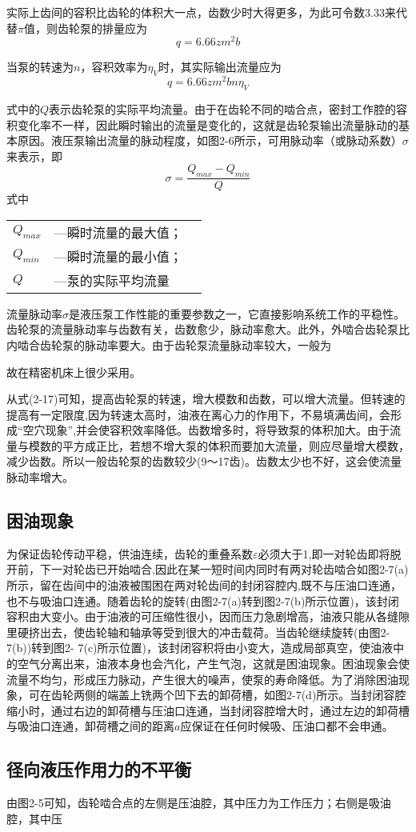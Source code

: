 实际上齿间的容积比齿轮的体积大一点，齿数少时大得更多，为此可令数3.33来代替$\pi$值，则齿轮泵的排量应为
\begin{equation}
  q=6.66 z m^2 b
\end{equation}

当泵的转速为$n$，容积效率为$\eta_{V}$时，其实际输出流量应为
\begin{equation}
  q=6.66 z m^2 b n \eta_{V}
\end{equation}

式中的$Q$表示齿轮泵的实际平均流量。由于在齿轮不同的啮合点，密封工作腔的容积变化率不一样，因此瞬时输出的流量是变化的，这就是齿轮泵输出流量脉动的基本原因。液压泵输出流量的脉动程度，如图2-6所示，可用脉动率（或脉动系数）$\sigma$来表示，即
\begin{equation}
  \sigma=\frac{{Q_{max}-Q_{min}}}{Q}
\end{equation} 
\noindent 式中\
\begin{tabular}[t]{lll}
  $Q_{max}$ &---瞬时流量的最大值；\\
  $Q_{min}$ &---瞬时流量的最小值；\\
  $Q$ &---泵的实际平均流量
  \end{tabular}
流量脉动率$\sigma$是液压泵工作性能的重要参数之一，它直接影响系统工作的平稳性。齿轮泵的流量脉动率与齿数有关，齿数愈少，脉动率愈大。此外，外啮合齿轮泵比内啮合齿轮泵的脉动率要大。由于齿轮泵流量脉动率较大，一般为

故在精密机床上很少采用。

从式(2-17)可知，提高齿轮泵的转速，增大模数和齿数，可以增大流量。但转速的提高有一定限度,因为转速太高时，油液在离心力的作用下，不易填满齿间，会形成“空穴现象”,并会使容积效率降低。齿数增多时，将导致泵的体积加大。由于流量与模数的平方成正比，若想不增大泵的体积而要加大流量，则应尽量增大模数，减少齿数。所以一般齿轮泵的齿数较少(9～17齿)。齿数太少也不好，这会使流量脉动率增大。
\subsection{困油现象}
为保证齿轮传动平稳，供油连续，齿轮的重叠系数$\varepsilon$必须大于1,即一对轮齿即将脱开前，下一对轮齿已开始啮合,因此在某一短时间内同时有两对轮齿啮合如图2-7(a)所示，留在齿间中的油液被围困在两对轮齿间的封闭容腔内,既不与压油口连通，也不与吸油口连通。随着齿轮的旋转(由图2-7(a)转到图2-7(b)所示位置)，该封闭容积由大变小。由于油液的可压缩性很小，因而压力急剧增高，油液只能从各缝隙里硬挤出去，使齿轮轴和轴承等受到很大的冲击载荷。当齿轮继续旋转(由图2-7(b))转到图2- 7(c)所示位置)，该封闭容积将由小变大，造成局部真空，使油液中的空气分离出来，油液本身也会汽化，产生气泡，这就是困油现象。困油现象会使流量不均匀，形成压力脉动，产生很大的噪声，使泵的寿命降低。为了消除困油现象，可在齿轮两侧的端盖上铣两个凹下去的卸荷槽，如图2-7(d)所示。当封闭容腔缩小时，通过右边的卸荷槽与压油口连通，当封闭容腔增大时，通过左边的卸荷槽与吸油口连通，卸荷槽之间的距离$a$应保证在任何时候吸、压油口都不会申通。
\subsection{径向液压作用力的不平衡}
由图2-5可知，齿轮啮合点的左侧是压油腔，其中压力为工作压力；右侧是吸油腔，其中压
